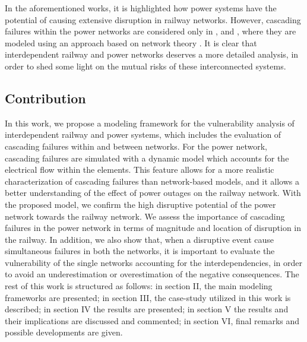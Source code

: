 \documentclass[review]{elsarticle}
\begin{document}
	In the aforementioned works, it is highlighted how power systems have the potential of causing extensive disruption in railway networks. However, cascading failures within the power networks are considered only in \cite{zhang2014approach}, \cite{zio2010modeling} and \cite{zio2011modeling}, where they are modeled using an approach based on network theory \cite{motter2002cascade}\cite{crucitti2004model}. It is clear that interdependent railway and power networks deserves a more detailed analysis, in order to shed some light on the mutual risks of these interconnected systems.
	\subsection{Contribution}
	In this work, we propose a modeling framework for the vulnerability analysis of interdependent railway and power systems, which includes the evaluation of cascading failures within and between networks. For the power network, cascading failures are simulated with a dynamic model which accounts for the electrical flow within the elements. This feature allows for a more realistic characterization of cascading failures than network-based models, and it allows a better understanding of the effect of power outages on the railway network. With the proposed model, we confirm the high disruptive potential of the power network towards the railway network. We assess the importance of cascading failures in the power network in terms of magnitude and location of disruption in the railway. In addition, we also show that, when a disruptive event cause simultaneous failures in both the networks, it is important to evaluate the vulnerability of the single networks accounting for the interdependencies, in order to avoid an underestimation or overestimation of the negative consequences. The rest of this work is structured as follows: in section II, the main modeling frameworks are presented; in section III, the case-study utilized in this work is described; in section IV the results are presented; in section V the results and their implications are discussed and commented; in section VI, final remarks and possible developments are given.

	
\end{document}
